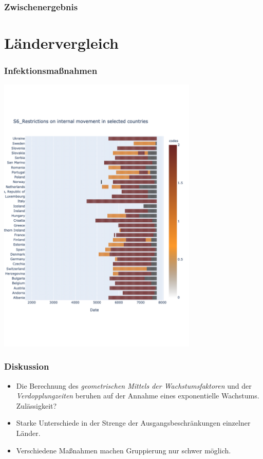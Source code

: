 \documentclass{beamer}
\begin{document}
 \begin{frame}
 	\frametitle{Zwischenergebnis}
 \end{frame}

\section{Ländervergleich}
\begin{frame}
	\frametitle{Infektionsmaßnahmen}
	\centering
	\includegraphics[width = 270pt]{responses_countries}
\end{frame}

\begin{frame}
	\frametitle{Diskussion}
	\begin{itemize}
		\item Die Berechnung des \emph{geometrischen Mittels der Wachstumsfaktoren} und der \emph{Verdopplungzeiten} beruhen auf der Annahme eines exponentielle Wachstums. Zulässigkeit?
		\item Starke Unterschiede in der Strenge der Ausgangsbeschränkungen einzelner Länder.
		\item Verschiedene Maßnahmen machen Gruppierung nur schwer möglich.
	\end{itemize}
\end{frame}
 
\end{document}
